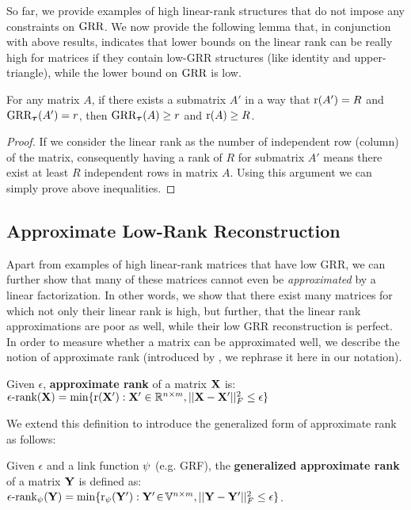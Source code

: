 \documentclass{article}
\begin{document}
So far, we provide examples of high linear-rank structures that do not impose any constraints on $\text{GRR}$.
We now provide the following lemma that, in conjunction with above results, indicates that lower bounds on the linear rank can be really high for matrices if they contain low-GRR structures (like identity and upper-triangle), while the lower bound on $\text{GRR}$ is low.
\begin{thm:lemma}
For any matrix $A$, if there exists a submatrix $A'$ in a way that $\mathrm{r}(A')=R$ and $\text{GRR}_{{\boldsymbol{\tau}}}(A')=r$, then $\text{GRR}_{{\boldsymbol{\tau}}}(A)\geq  r$ and $\mathrm{r}(A)\geq R$. 
\begin{proof}
If we consider the linear rank as the number of independent row (column) of the matrix, consequently having a rank of $R$ for submatrix $A'$ means there exist at least $R$ independent rows in matrix $A$. Using this argument we can simply prove above inequalities.
\end{proof}
\end{thm:lemma}




\subsection{Approximate Low-Rank Reconstruction}

Apart from examples of high linear-rank matrices that have low GRR, we can further show that many of these matrices cannot even be \emph{approximated} by a linear factorization.
In other words, we show that there exist many matrices for which not only their linear rank is high, but further, that the linear rank approximations are poor as well, while their low GRR reconstruction is perfect.
In order to measure whether a matrix can be approximated well, we describe the notion of approximate rank (introduced by \citet{alon13:the-approximate}, we rephrase it here in our notation).
\begin{thm:def}
Given $\epsilon$, \textbf{approximate rank} of a matrix $\mathbf{X}$ is:\\
$
\epsilon\text{-rank}(\mathbf{X}) = \min\{\mathrm{r}(\mathbf{X}'): \mathbf{X}'\in{\mathbb{R}}^{n\times m}, ||\mathbf{X}-\mathbf{X}'||^2_F\le\epsilon\}
$
\end{thm:def}
We extend this definition to introduce the generalized form of approximate rank as follows:
\begin{thm:def}
Given $\epsilon$ and a link function $\psi$ (e.g. GRF), the \textbf{generalized approximate rank} of a matrix $\mathbf{Y}$ is defined as:
\hspace{5mm}
$%
\apprank_\link(\Y) = \min\{\rank_\link(\Y'): \Y'\!\in\!\mathbb{V}^{n\times m}, ||\Y-\Y'||^2_F\le\epsilon\}
$. %
\end{thm:def}
\end{document}
